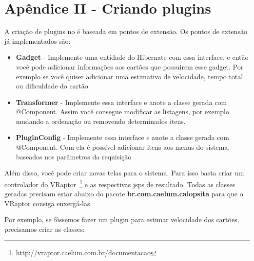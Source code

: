 \section{Apêndice II - Criando plugins}

A criação de plugins no \calopsita{} é baseada em pontos de extensão. Os pontos de extensão já implementados são:

\begin{itemize}
	\item{\textbf{Gadget} - Implemente uma entidade do Hibernate com essa interface, e então você pode adicionar informações aos cartões que possuirem esse gadget. Por exemplo se você quiser adicionar uma estimativa de velocidade, tempo total ou dificuldade do cartão}
	\item{\textbf{Transformer} - Implemente essa interface e anote a classe gerada com @Component. Assim você consegue modificar as listagens, por exemplo mudando a ordenação ou removendo determinados itens.}
	\item{\textbf{PluginConfig} - Implemente essa interface e anote a classe gerada com @Component. Com ela é possível adicionar itens aos menus do sistema, baseados nos parâmetros da requisição}
\end{itemize}

Além disso, você pode criar novas telas para o sistema. Para isso basta criar um controlador do 
VRaptor~\footnote{http://vraptor.caelum.com.br/documentacao} e as respectivas jsps de resultado.
Todas as classes geradas precisam estar abaixo do pacote \textbf{br.com.caelum.calopsita} para que o VRaptor consiga enxergá-las.

Por exemplo, se fôssemos fazer um plugin para estimar velocidade dos cartões, precisamos criar as classes:

